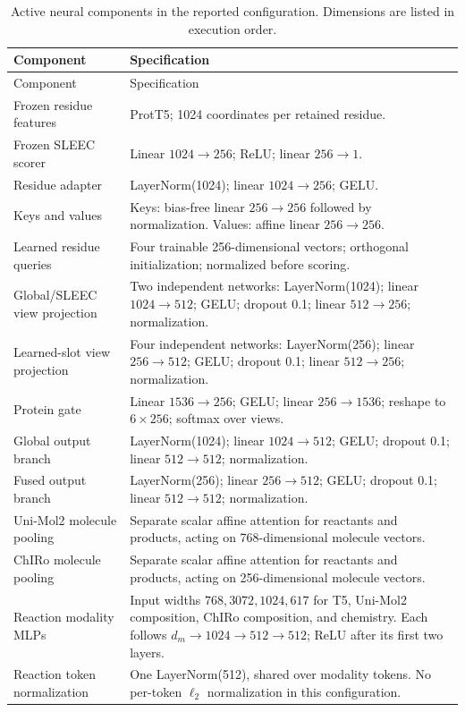 \begin{longtable}{>{\raggedright\arraybackslash}p{}>{\raggedright\arraybackslash}p{}}
\caption{Active neural components in the reported configuration.
Dimensions are listed in execution order.}\label{tab:v4-layers}\\
\toprule
Component & Specification\\
\midrule
\endfirsthead
\toprule Component & Specification\\\midrule
\endhead
Frozen residue features & ProtT5; 1024 coordinates per retained residue.\\
Frozen SLEEC scorer & Linear $1024\to256$; ReLU; linear $256\to1$.\\
Residue adapter & LayerNorm(1024); linear $1024\to256$; GELU.\\
Keys and values & Keys: bias-free linear $256\to256$ followed by normalization. Values: affine linear $256\to256$.\\
Learned residue queries & Four trainable 256-dimensional vectors; orthogonal initialization; normalized before scoring.\\
Global/SLEEC view projection & Two independent networks: LayerNorm(1024); linear $1024\to512$; GELU; dropout 0.1; linear $512\to256$; normalization.\\
Learned-slot view projection & Four independent networks: LayerNorm(256); linear $256\to512$; GELU; dropout 0.1; linear $512\to256$; normalization.\\
Protein gate & Linear $1536\to256$; GELU; linear $256\to1536$; reshape to $6\times256$; softmax over views.\\
Global output branch & LayerNorm(1024); linear $1024\to512$; GELU; dropout 0.1; linear $512\to512$; normalization.\\
Fused output branch & LayerNorm(256); linear $256\to512$; GELU; dropout 0.1; linear $512\to512$; normalization.\\
Uni-Mol2 molecule pooling & Separate scalar affine attention for reactants and products, acting on 768-dimensional molecule vectors.\\
ChIRo molecule pooling & Separate scalar affine attention for reactants and products, acting on 256-dimensional molecule vectors.\\
Reaction modality MLPs & Input widths $768,3072,1024,617$ for T5, Uni-Mol2 composition, ChIRo composition, and chemistry. Each follows $d_m\to1024\to512\to512$; ReLU after its first two layers.\\
Reaction token normalization & One LayerNorm(512), shared over modality tokens. No per-token $\ell_2$ normalization in this configuration.\\

\end{longtable}
